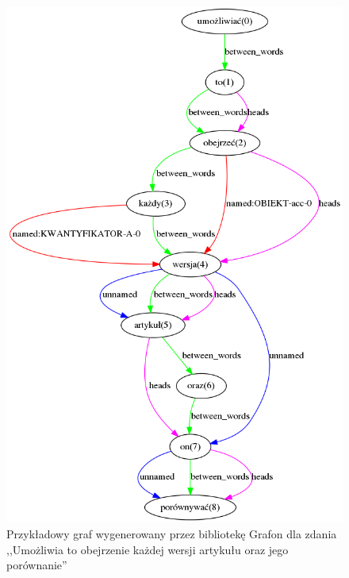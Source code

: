 \documentclass[a4paper, twoside, 12pt]{report}
\begin{document}
        \begin{figure}[h!]
                \centering
                \includegraphics[scale=0.65]{example_grafon_graph}
                \caption{Przykładowy graf wygenerowany przez bibliotekę Grafon dla zdania ,,Umożliwia to obejrzenie każdej
                wersji artykułu oraz jego porównanie''}
                \label{GRAFON_EXAMPLE}
        \end{figure}
\end{document}

